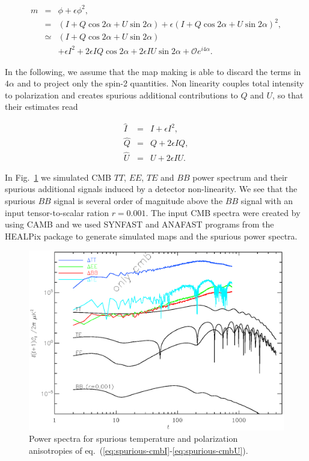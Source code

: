 \begin{eqnarray}
m &=& \phi + \epsilon\phi^2, \nonumber \\
&=& (I+Q\cos2\alpha+U\sin2\alpha) + \epsilon(I+Q\cos2\alpha+U\sin2\alpha)^2, \nonumber\\
 &\simeq & (I+Q\cos2\alpha+U\sin2\alpha) \nonumber \\
&&+\epsilon I^{2} + 2\epsilon IQ\cos2\alpha + 
2\epsilon IU \sin2\alpha + \mathcal{O}e^{i4\alpha}.
\label{eq:eq-NL}
\end{eqnarray}

In the following, we assume that the map making is able to discard the terms in
$4\alpha$ and to project only the spin-2 quantities. Non linearity couples total
intensity to polarization and creates spurious additional contributions to $Q$
and $U$, so that their estimates read

\begin{eqnarray}
\hat{I} &=& I + \epsilon I^2, \label{eq:spurious-cmbI}\\
\hat{Q} &=& Q + 2\epsilon IQ, \label{eq:spurious-cmbQ}\\
\hat{U} &=& U + 2\epsilon IU \label{eq:spurious-cmbU}.
\end{eqnarray}

In Fig.~\ref{fig:cmb_power_spectra} we simulated CMB $TT$, $EE$, $TE$ and $BB$ power spectrum and their spurious additional signals induced by a detector non-linearity. We see that the spurious $BB$ signal is several order of magnitude above the $BB$ signal with an input tensor-to-scalar ration $r = 0.001$. The input CMB spectra were created by using CAMB \citep{2011ascl.soft02026L} and we used SYNFAST and ANAFAST programs from the HEALPix package \citep{2005ApJ...622..759G} to generate simulated maps and the spurious power spectra.

\begin{figure}
  \includegraphics[clip, angle=0, width=\columnwidth]{Figures/cmb_power_spectra.eps}
  \caption{Power spectra for spurious temperature and polarization anisotropies of eq.~(\ref{eq:spurious-cmbI}-\ref{eq:spurious-cmbU}).}
  \label{fig:cmb_power_spectra}
\end{figure}

